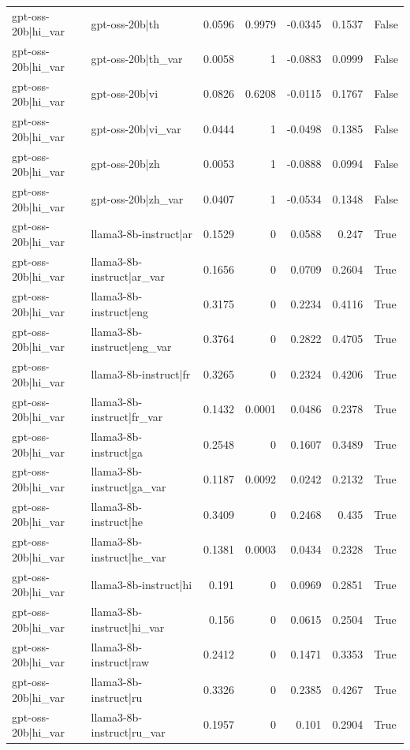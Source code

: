 \begin{table}
\begin{tabular}{l l r r r r l}
gpt-oss-20b|hi_var & gpt-oss-20b|th & 0.0596 & 0.9979 & -0.0345 & 0.1537 & False \\
gpt-oss-20b|hi_var & gpt-oss-20b|th_var & 0.0058 & 1 & -0.0883 & 0.0999 & False \\
gpt-oss-20b|hi_var & gpt-oss-20b|vi & 0.0826 & 0.6208 & -0.0115 & 0.1767 & False \\
gpt-oss-20b|hi_var & gpt-oss-20b|vi_var & 0.0444 & 1 & -0.0498 & 0.1385 & False \\
gpt-oss-20b|hi_var & gpt-oss-20b|zh & 0.0053 & 1 & -0.0888 & 0.0994 & False \\
gpt-oss-20b|hi_var & gpt-oss-20b|zh_var & 0.0407 & 1 & -0.0534 & 0.1348 & False \\
gpt-oss-20b|hi_var & llama3-8b-instruct|ar & 0.1529 & 0 & 0.0588 & 0.247 & True \\
gpt-oss-20b|hi_var & llama3-8b-instruct|ar_var & 0.1656 & 0 & 0.0709 & 0.2604 & True \\
gpt-oss-20b|hi_var & llama3-8b-instruct|eng & 0.3175 & 0 & 0.2234 & 0.4116 & True \\
gpt-oss-20b|hi_var & llama3-8b-instruct|eng_var & 0.3764 & 0 & 0.2822 & 0.4705 & True \\
gpt-oss-20b|hi_var & llama3-8b-instruct|fr & 0.3265 & 0 & 0.2324 & 0.4206 & True \\
gpt-oss-20b|hi_var & llama3-8b-instruct|fr_var & 0.1432 & 0.0001 & 0.0486 & 0.2378 & True \\
gpt-oss-20b|hi_var & llama3-8b-instruct|ga & 0.2548 & 0 & 0.1607 & 0.3489 & True \\
gpt-oss-20b|hi_var & llama3-8b-instruct|ga_var & 0.1187 & 0.0092 & 0.0242 & 0.2132 & True \\
gpt-oss-20b|hi_var & llama3-8b-instruct|he & 0.3409 & 0 & 0.2468 & 0.435 & True \\
gpt-oss-20b|hi_var & llama3-8b-instruct|he_var & 0.1381 & 0.0003 & 0.0434 & 0.2328 & True \\
gpt-oss-20b|hi_var & llama3-8b-instruct|hi & 0.191 & 0 & 0.0969 & 0.2851 & True \\
gpt-oss-20b|hi_var & llama3-8b-instruct|hi_var & 0.156 & 0 & 0.0615 & 0.2504 & True \\
gpt-oss-20b|hi_var & llama3-8b-instruct|raw & 0.2412 & 0 & 0.1471 & 0.3353 & True \\
gpt-oss-20b|hi_var & llama3-8b-instruct|ru & 0.3326 & 0 & 0.2385 & 0.4267 & True \\
gpt-oss-20b|hi_var & llama3-8b-instruct|ru_var & 0.1957 & 0 & 0.101 & 0.2904 & True \\

\end{tabular}
\end{table}
